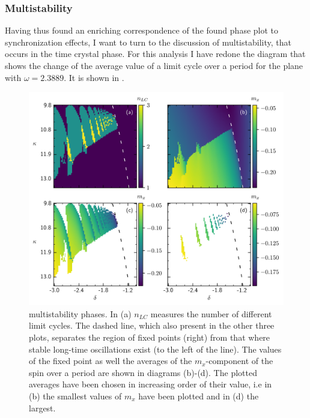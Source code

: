 \subsubsection{Multistability}\label{sec:multistability}
Having thus found an enriching correspondence of the found phase plot to synchronization effects, I want to turn to the discussion of multistability, that occurs in the time crystal phase. For this analysis I have redone the diagram that shows the change of the average value of a limit cycle over a period for the plane with $\omega=2.3889$. It is shown in .
\begin{figure}[H]
    \hspace*{-1.2cm}
    \includegraphics{pictures/limit_cycle_mean.png}
    \caption{multistability phases. In (a) $n_{LC}$ measures the number of different limit cycles. The dashed line, which also present in the other three plots, separates the region of fixed points (right) from that where stable long-time oscillations exist (to the left of the line). The values of the fixed point as well the averages of the $m_x$-component of the spin over a period are shown in diagrams (b)-(d). The plotted averages have been chosen in increasing order of their value, i.e in (b) the smallest values of $m_x$ have been plotted and in (d) the largest.}
    \label{fig:precise_multistab2d}
\end{figure}
